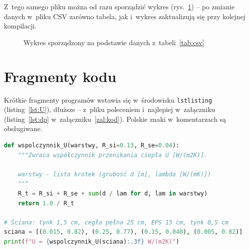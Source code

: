 Z~tego samego pliku można od razu sporządzić wykres
(rys.~\ref{fig:csv}) -- po zmianie danych w~pliku CSV zarówno tabela, jak
i~wykres zaktualizują się przy kolejnej kompilacji.

\tabCieplo
\begin{figure}[htbp]
  \centering
  \pgfplotsset{/pgf/number format/read comma as period}
  \caption{Wykres sporządzony na podstawie danych z~tabeli~\ref{tab:csv}}
  \label{fig:csv}
\end{figure}

\section{Fragmenty kodu}
\label{sec:kod}

Krótkie fragmenty programów wstawia się w~środowisku \texttt{lstlisting}
(listing~\ref{lst:U}), dłuższe -- z~pliku poleceniem
\verb|| i~najlepiej w~załączniku (listing~\ref{lst:dp}
w~załączniku~\ref{zal:kod}). Polskie znaki w~komentarzach są obsługiwane.

\begin{lstlisting}[language=Python, caption={Obliczanie współczynnika
  przenikania ciepła przegrody}, label={lst:U}]
def wspolczynnik_U(warstwy, R_si=0.13, R_se=0.04):
    """Zwraca współczynnik przenikania ciepła U [W/(m2K)].

    warstwy - lista krotek (grubość d [m], lambda [W/(mK)])
    """
    R_t = R_si + R_se + sum(d / lam for d, lam in warstwy)
    return 1.0 / R_t

# Ściana: tynk 1,5 cm, cegła pełna 25 cm, EPS 15 cm, tynk 0,5 cm
sciana = [(0.015, 0.82), (0.25, 0.77), (0.15, 0.040), (0.005, 0.82)]
print(f"U = {wspolczynnik_U(sciana):.3f} W/(m2K)")
\end{lstlisting}

